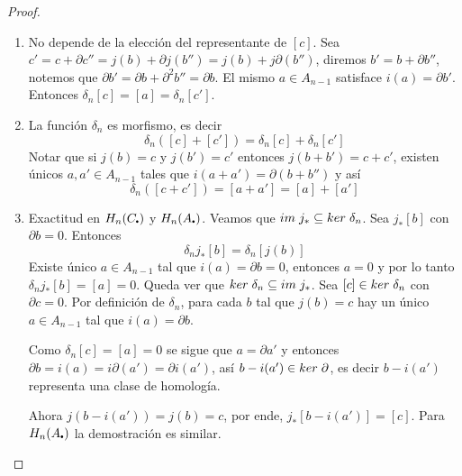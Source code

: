 \documentclass[aop]{imsart2}
\theoremstyle{plain}
\theoremstyle{remark}
\newcommand{\im}[1]{im\hspace{1mm}#1}
\newcommand{\kr}[1]{ker\hspace{1mm}#1}
\newcommand\sbullet[1][.5]{\mathbin{\vcenter{\hbox{\scalebox{#1}{$\bullet$}}}}}
\begin{document}
\begin{proof}
\begin{enumerate}
        \item No depende de la elección del representante de $[c]$. Sea $c'=c+\partial c''
        =j(b)+\partial j(b'')=j(b)+j\partial(b'')$, diremos $b'=b+\partial b''$, notemos que
        $\partial b'=\partial b+\partial^{2}b''=\partial b$. El mismo $a\in A_{n-1}$ satisface
        $i(a)=\partial b'$. Entonces $\delta_{n}[c]=[a]=\delta_{n}[c']$.

        \item La función $\delta_{n}$ es morfismo, es decir
        \begin{equation*}
            \delta_{n}([c]+[c'])=\delta_{n}[c]+\delta_{n}[c']
        \end{equation*}
        Notar que si $j(b)=c$ y $j(b')=c'$ entonces $j(b+b')=c+c'$, existen únicos 
        $a,a'\in A_{n-1}$ tales que $i(a+a')=\partial(b+b'')$ y así
        \begin{equation*}
            \delta_{n}([c+c'])=[a+a']=[a]+[a']
        \end{equation*}

        \item Exactitud en $H_{n}(C_{\sbullet})$ y $H_{n}(A_{\sbullet})$. Veamos que 
        $\im{j_{*}}\subseteq\kr{\delta_{n}}$. Sea $j_{*}[b]$ con $\partial b=0$. Entonces
        \begin{equation*}
            \delta_{n}j_{*}[b]=\delta_{n}[j(b)]
        \end{equation*}
        Existe único $a\in A_{n-1}$ tal que $i(a)=\partial b=0$, entonces $a=0$ y por lo tanto
        $\delta_{n}j_{*}[b]=[a]=0$. Queda ver que $\kr{\delta_{n}}\subseteq\im{j_{*}}$. Sea
        $[c]\in\kr{\delta_{n}}$ con $\partial c=0$. Por definición de $\delta_{n}$, para cada
        $b$ tal que $j(b)=c$ hay un único $a\in A_{n-1}$ tal que $i(a)=\partial b$.

        \vspace{1mm}
        \noindent Como $\delta_{n}[c]=[a]=0$ se sigue que $a=\partial a'$ y entonces 
        $\partial b=i(a)=i\partial(a')=\partial i(a')$, así $b-i(a')\in\kr{\partial}$, es decir
        $b-i(a')$ representa una clase de homología.

        \vspace{1mm}
        \noindent Ahora $j(b-i(a'))=j(b)=c$, por ende, $j_{*}[b-i(a')]=[c]$. Para 
        $H_{n}(A_{\sbullet})$ la demostración es similar.


\end{enumerate}
\end{proof}
\end{document}
